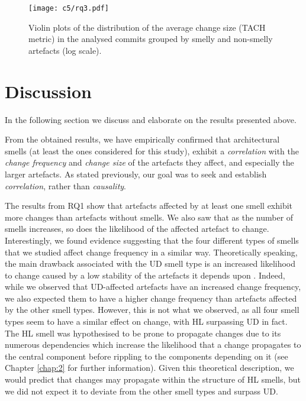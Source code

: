 \begin{figure}
    \centering
    \texttt{[image: c5/rq3.pdf]}
    \caption{Violin plots of the distribution of the average change size (TACH metric) in the analysed commits grouped by  smelly and non-smelly artefacts (log scale).}\label{c5:fig:rq3-violinplots}
\end{figure}


\section{Discussion}\label{c5:sec:discussion}
In the following section we discuss and elaborate on the results presented above.

From the obtained results, we have empirically confirmed that architectural smells (at least the ones considered for this study), exhibit a \emph{correlation} with the \emph{change frequency} and \emph{change size} of the artefacts they affect, and especially the larger artefacts.
As stated previously, our goal was to seek and establish \emph{correlation}, rather than \emph{causality}.

The results from RQ1 show that artefacts affected by at least one smell exhibit more changes than artefacts without smells. We also saw that as the number of smells increases, so does the likelihood of the affected artefact to change. 
Interestingly, we found evidence suggesting that the four different types of smells that we studied affect change frequency in a similar way. 
Theoretically speaking, the main drawback associated with the UD smell type \cite{Arcelli2016} is an increased likelihood to change caused by a low stability of the artefacts it depends upon \cite{Martin2018}.
Indeed, while we observed that UD-affected artefacts have an increased change frequency, we also expected them to have a higher change frequency than artefacts affected by the other smell types. However, this is not what we observed, as all four smell types seem to have a similar effect on change, with HL surpassing UD in fact.
The HL smell was hypothesised to be prone to propagate changes due to its numerous dependencies which increase the likelihood that a change propagates to the central component before rippling to the components depending on it (see Chapter \ref{chap:2} for further information).
Given this theoretical description, we would predict that changes may propagate within the structure of HL smells, but we did not expect it to deviate from the other smell types and surpass UD.

